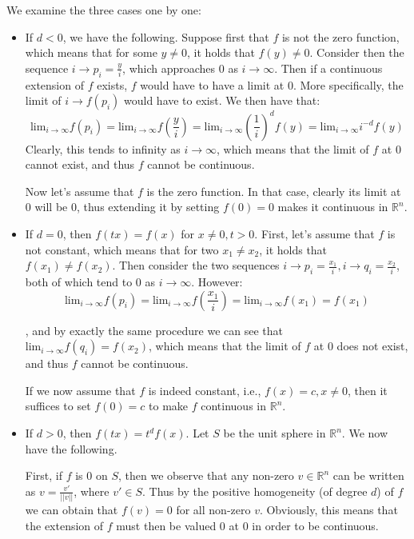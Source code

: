 \begin{solution}
    We examine the three cases one by one:
    \begin{itemize}
        \item If $d <0$, we have the following. Suppose first that $f$ is not the zero function, which means that for some $y \neq 0$, it holds that $f(y) \neq 0$. Consider then the sequence $i \rightarrow p_i = \frac{y}{i}$, which approaches $0$ as $i \rightarrow \infty$. Then if a continuous extension of $f$ exists, $f$ would have to have a limit at 0. More specifically, the limit of $i \rightarrow f(p_i)$ would have to exist. We then have that:
        $$\text{lim}_{i \rightarrow \infty} f(p_i) = \text{lim}_{i \rightarrow \infty} f(\frac{y}{i}) = \text{lim}_{i \rightarrow \infty} (\frac{1}{i})^df(y) = \text{lim}_{i \rightarrow \infty} i^{-d}f(y)$$
        Clearly, this tends to infinity as $i \rightarrow \infty$, which means that the limit of $f$ at 0 cannot exist, and thus $f$ cannot be continuous.

        Now let's assume that $f$ is the zero function. In that case, clearly its limit at 0 will be 0, thus extending it by setting $f(0) = 0$ makes it continuous in $\mathbb{R}^n$.
        \item If $d = 0$, then $f(tx) = f(x)$ for $x \neq 0, t > 0$. First, let's assume that $f$ is not constant, which means that for two $x_1 \neq x_2$, it holds that $f(x_1) \neq f(x_2)$. Then consider the two sequences $i \rightarrow p_i = \frac{x_1}{i}, i \rightarrow q_i = \frac{x_2}{i}$, both of which tend to 0 as $i \rightarrow \infty$. However:
        $$\text{lim}_{i \rightarrow \infty}f(p_i) = \text{lim}_{i \rightarrow \infty} f(\frac{x_1}{i}) = \text{lim}_{i \rightarrow \infty} f(x_1) = f(x_1)$$

        , and by exactly the same procedure we can see that $\text{lim}_{i \rightarrow \infty}f(q_i) = f(x_2)$, which means that the limit of $f$ at 0 does not exist, and thus $f$ cannot be continuous.

        If we now assume that $f$ is indeed constant, i.e., $f(x) = c, x \neq 0$, then it suffices to set $f(0)=c$ to make $f$ continuous in $\mathbb{R}^n$.

        \item If $d > 0$, then $f(tx) = t^df(x)$. Let $S$ be the unit sphere in $\mathbb{R}^n$. We now have the following.

        First, if $f$ is 0 on $S$, then we observe that any non-zero $v \in \mathbb{R}^n$ can be written as $v = \frac{v'}{\lvert \lvert v \rvert \rvert}$, where $v' \in S$. Thus by the positive homogeneity (of degree $d$) of $f$ we can obtain that $f(v) = 0$ for all non-zero $v$. Obviously, this means that the extension of $f$ must then be valued 0 at 0 in order to be continuous.


\end{itemize}
\end{solution}
